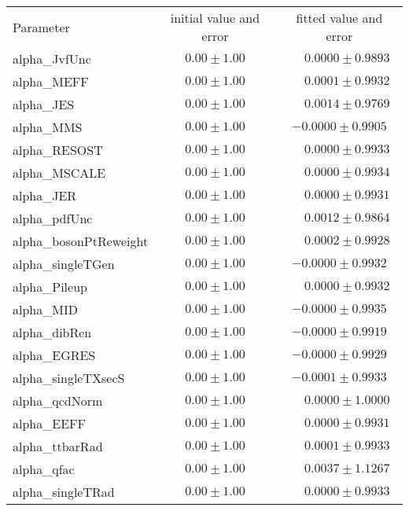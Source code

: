 
\begin{table}
\begin{center}
\setlength{\tabcolsep}{0.0pc}
\begin{tabular*}{\textwidth}{@{\extracolsep{\fill}}lcc}
\noalign{\smallskip}\hline\noalign{\smallskip}
Parameter                                   &    initial value and error & fitted value and error       \\
\noalign{\smallskip}\hline\noalign{\smallskip}
alpha\_JvfUnc & $0.00\pm 1.00$  & $ \phantom{-}0.0000\pm 0.9893$  \\
alpha\_MEFF & $0.00\pm 1.00$  & $ \phantom{-}0.0001\pm 0.9932$  \\
alpha\_JES & $0.00\pm 1.00$  & $ \phantom{-}0.0014\pm 0.9769$  \\
alpha\_MMS & $0.00\pm 1.00$  & $ -0.0000\pm 0.9905$  \\
alpha\_RESOST & $0.00\pm 1.00$  & $ \phantom{-}0.0000\pm 0.9933$  \\
alpha\_MSCALE & $0.00\pm 1.00$  & $ \phantom{-}0.0000\pm 0.9934$  \\
alpha\_JER & $0.00\pm 1.00$  & $ \phantom{-}0.0000\pm 0.9931$  \\
alpha\_pdfUnc & $0.00\pm 1.00$  & $ \phantom{-}0.0012\pm 0.9864$  \\
alpha\_bosonPtReweight & $0.00\pm 1.00$  & $ \phantom{-}0.0002\pm 0.9928$  \\
alpha\_singleTGen & $0.00\pm 1.00$  & $ -0.0000\pm 0.9932$  \\
alpha\_Pileup & $0.00\pm 1.00$  & $ \phantom{-}0.0000\pm 0.9932$  \\
alpha\_MID & $0.00\pm 1.00$  & $ -0.0000\pm 0.9935$  \\
alpha\_dibRen & $0.00\pm 1.00$  & $ -0.0000\pm 0.9919$  \\
alpha\_EGRES & $0.00\pm 1.00$  & $ -0.0000\pm 0.9929$  \\
alpha\_singleTXsecS & $0.00\pm 1.00$  & $ -0.0001\pm 0.9933$  \\
alpha\_qcdNorm & $0.00\pm 1.00$  & $ \phantom{-}0.0000\pm 1.0000$  \\
alpha\_EEFF & $0.00\pm 1.00$  & $ \phantom{-}0.0000\pm 0.9931$  \\
alpha\_ttbarRad & $0.00\pm 1.00$  & $ \phantom{-}0.0001\pm 0.9933$  \\
alpha\_qfac & $0.00\pm 1.00$  & $ \phantom{-}0.0037\pm 1.1267$  \\
alpha\_singleTRad & $0.00\pm 1.00$  & $ \phantom{-}0.0000\pm 0.9933$  \\

\end{tabular*}
\end{center}
\end{table}
